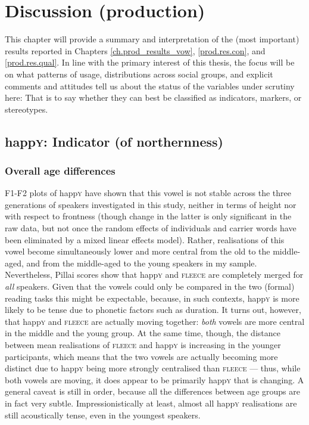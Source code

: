 \chapter{Discussion (production)}
\label{ch.prod_discussion}

This chapter will provide a summary and interpretation of the (most important) results reported in Chapters \ref{ch.prod_results_vow}, \ref{prod.res.con}, and \ref{prod.res.qual}.
In line with the primary interest of this thesis, the focus will be on what patterns of usage, distributions across social groups, and explicit comments and attitudes tell us about the status of the variables under scrutiny here: That is to say whether they can best be classified as indicators, markers, or stereotypes.

\section{happ\textrm{\textsc{y}}: Indicator (of northernness)}
\label{prod.disc.happy}

\subsection{Overall age differences}
\label{prod.disc.happy.age}

F1-F2 plots of happ\textsc{y} have shown that this vowel is not stable across the three generations of speakers investigated in this study, neither in terms of height nor with respect to frontness (though change in the latter is only significant in the raw data, but not once the random effects of individuals and carrier words have been eliminated by a mixed linear effects model).
Rather, realisations of this vowel become simultaneously lower and more central from the old to the middle-aged, and from the middle-aged to the young speakers in my sample.
Nevertheless, Pillai scores show that happ\textsc{y} and \textsc{fleece} are completely merged for \emph{all} speakers.
Given that the vowels could only be compared in the two (formal) reading tasks this might be expectable, because, in such contexts, happ\textsc{y} is more likely to be tense due to phonetic factors such as duration.
It turns out, however, that happ\textsc{y} and \textsc{fleece} are actually moving together: \emph{both} vowels are more central in the middle and the young group.
At the same time, though, the distance between mean realisations of \textsc{fleece} and happ\textsc{y} is increasing in the younger participants, which means that the two vowels are actually becoming more distinct due to happ\textsc{y} being more strongly centralised than \textsc{fleece} --- thus, while both vowels are moving, it does appear to be primarily happ\textsc{y} that is changing.
A general caveat is still in order, because all the differences between age groups are in fact very subtle.
Impressionistically at least, almost all happ\textsc{y} realisations are still acoustically tense, even in the youngest speakers.

